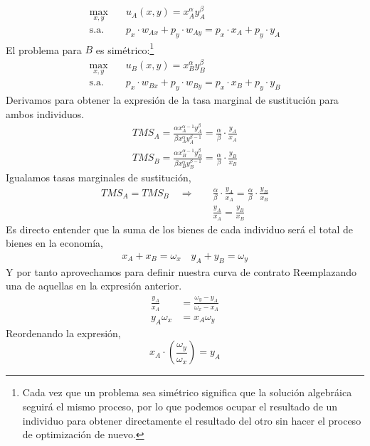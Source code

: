\begin{align*}
    \max_{x,y} &\quad u_A(x,y) = x_A^\alpha y_A^{\beta}\quad \\
    \text{s.a.} &\quad p_x \cdot w_{Ax} + p_y \cdot w_{Ay} = p_x \cdot x_A + p_y \cdot y_A
\end{align*}
El problema para $B$ es simétrico:\footnote{Cada vez que un problema sea simétrico significa que la solución algebráica seguirá el mismo proceso, por lo que podemos ocupar el resultado de un individuo para obtener directamente el resultado del otro sin hacer el proceso de optimización de nuevo.}
\begin{align*}
    \max_{x,y} &\quad u_B(x,y) = x_B^\alpha y_B^{\beta}\quad \\
    \text{s.a.} &\quad p_x \cdot w_{Bx} + p_y \cdot w_{By} = p_x \cdot x_B + p_y \cdot y_B
\end{align*}
Derivamos para obtener la expresión de la tasa marginal de sustitución para ambos individuos. 
\begin{align*}
    TMS_A  = \frac{\alpha x_A^{\alpha -1} y_A^{\beta}}{\beta x_A^\alpha y_A^{\beta -1} } = \frac{\alpha}{\beta} \cdot \frac{y_A}{x_A} \\
    TMS_B= \frac{\alpha x_B^{\alpha -1} y_B^{\beta}}{\beta x_B^\alpha y_B^{\beta -1} } = \frac{\alpha}{\beta} \cdot \frac{y_B}{x_B} 
\end{align*}
Igualamos tasas marginales de sustitución,
\begin{align*}
    TMS_A = TMS_B \quad \Longrightarrow \quad& \frac{\alpha}{\beta} \cdot \frac{y_A}{x_A} = \frac{\alpha}{\beta} \cdot \frac{y_B}{x_B} \\
   &  \frac{y_A}{x_A} = \frac{y_B}{x_B}
\end{align*}
Es directo entender que la suma de los bienes de cada individuo será el total de bienes en la economía,
\begin{align*}
    x_A + x_B = \omega_x \quad 
    y_A + y_B = \omega_y
\end{align*}
Y por tanto aprovechamos para definir nuestra curva de contrato Reemplazando una de aquellas en la expresión anterior.
\begin{align*}
    \frac{y_A}{x_A} &= \frac{\omega_y - y_A}{\omega_x - x_A} \\
    y_A\omega_x &= x_A\omega_y
\end{align*}
Reordenando la expresión,
\begin{equation}
    x_A \cdot \left( \frac{\omega_y}{ \omega_x} \right) = y_A \label{eq:curva de contrato}
\end{equation}
